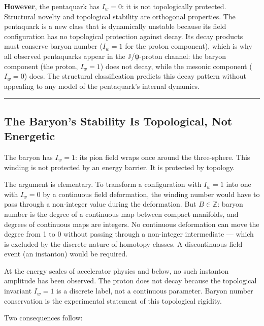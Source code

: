 \textbf{However}, the pentaquark has \(I_w = 0\): it is not
topologically protected. Structural novelty and topological stability
are orthogonal properties. The pentaquark is a new class that
is dynamically unstable because its field configuration has no
topological protection against decay. Its decay products must conserve
baryon number (\(I_w = 1\) for the proton component), which is why all
observed pentaquarks appear in the J/ψ-proton channel: the baryon
component (the proton, \(I_w = 1\)) does not decay, while the mesonic
component (\(I_w = 0\)) does. The structural classification predicts
this decay pattern without appealing to any model of the pentaquark's
internal dynamics.

\begin{center}\rule{0.5\linewidth}{0.5pt}\end{center}

\hypertarget{the-baryons-stability-is-topological-not-energetic}{%
\subsection{The Baryon's Stability Is Topological, Not
Energetic}\label{the-baryons-stability-is-topological-not-energetic}}

The baryon has \(I_w = 1\): its pion field wraps once around the
three-sphere. This winding is not protected by an energy barrier. It is
protected by topology.

The argument is elementary. To transform a configuration with
\(I_w = 1\) into one with \(I_w = 0\) by a continuous field deformation,
the winding number would have to pass through a non-integer value during
the deformation. But \(B \in \mathbb{Z}\): baryon number is the degree
of a continuous map between compact manifolds, and degrees of continuous
maps are integers. No continuous deformation can move the degree from 1
to 0 without passing through a non-integer intermediate --- which is
excluded by the discrete nature of homotopy classes. A discontinuous
field event (an instanton) would be required.

At the energy scales of accelerator physics and below, no such instanton
amplitude has been observed. The proton does not decay because the
topological invariant \(I_w = 1\) is a discrete label, not a continuous
parameter. Baryon number conservation is the experimental statement of
this topological rigidity.

Two consequences follow:

